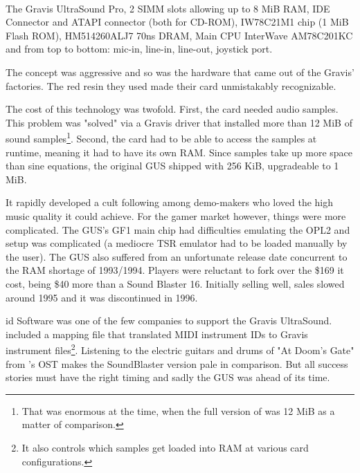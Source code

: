 \\
\par
The Gravis UltraSound Pro,  2 SIMM slots allowing up to 8 MiB RAM,  IDE Connector and  ATAPI connector (both for CD-ROM),  IW78C21M1 chip (1 MiB Flash ROM),  HM514260ALJ7 70ns DRAM,  Main CPU InterWave AM78C201KC and  from top to bottom: mic-in, line-in, line-out, joystick port.\\

The concept was aggressive and so was the hardware that came out of the Gravis' factories. The red resin they used made their card unmistakably recognizable.\\
\par
The cost of this technology was twofold. First, the card needed audio samples. This problem was "solved" via a Gravis driver that installed more than 12 MiB of sound samples\footnote{That was enormous at the time, when the full version of \doom{} was 12 MiB as a matter of comparison.}. Second, the card had to be able to access the samples at runtime, meaning it had to have its own RAM. Since samples take up more space than sine equations, the original GUS shipped with 256 KiB, upgradeable to 1 MiB.\\
\par
It rapidly developed a cult following among demo-makers who loved the high music quality it could achieve. For the gamer market however, things were more complicated. The GUS's GF1 main chip had difficulties emulating the OPL2 and setup was complicated (a mediocre TSR emulator had to be loaded manually by the user). The GUS also suffered from an unfortunate release date concurrent to the RAM shortage of 1993/1994. Players were reluctant to fork over the \$169 it cost, being \$40 more than a Sound Blaster 16. Initially selling well, sales slowed around 1995 and it was discontinued in 1996.\\
\par
 id Software was one of the few companies to support the Gravis UltraSound. \doom{} included a mapping file that translated MIDI instrument IDs to Gravis  instrument files\footnote{It also controls which samples get loaded into RAM at various card configurations.}. Listening to the electric guitars and drums of "At Doom's Gate" from \doom{}'s OST makes the SoundBlaster version pale in comparison. But all success stories must have the right timing and sadly the GUS was ahead of its time.\vspace{-5pt}

